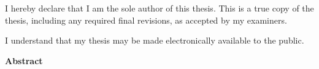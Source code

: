   

\cleardoublepage

  \noindent
I hereby declare that I am the sole author of this thesis. This is a true copy of the thesis, including any required final revisions, as accepted by my examiners.

  \bigskip
  
  \noindent
I understand that my thesis may be made electronically available to the public.

\cleardoublepage


\begin{center}\textbf{Abstract}\end{center}


